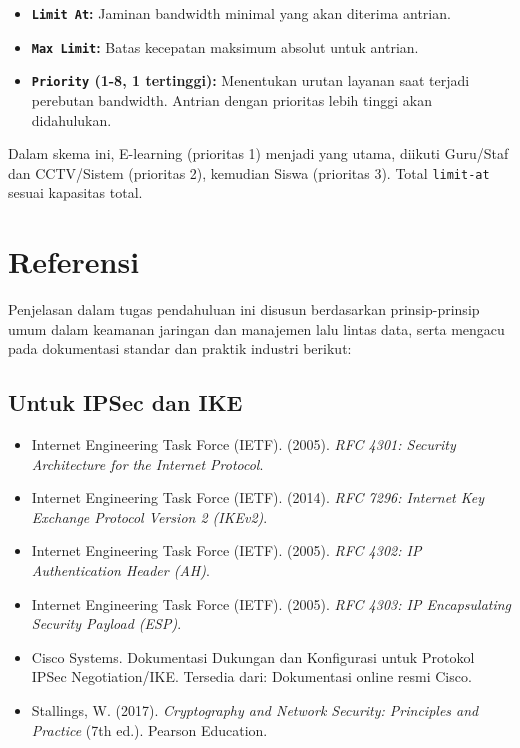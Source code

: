 \begin{enumerate}
\begin{itemize}
        \begin{itemize}
            \item \textbf{\texttt{Limit At}:} Jaminan bandwidth minimal yang akan diterima antrian.
            \item \textbf{\texttt{Max Limit}:} Batas kecepatan maksimum absolut untuk antrian.
            \item \textbf{\texttt{Priority} (1-8, 1 tertinggi):} Menentukan urutan layanan saat terjadi perebutan bandwidth. Antrian dengan prioritas lebih tinggi akan didahulukan.
        \end{itemize}
        Dalam skema ini, E-learning (prioritas 1) menjadi yang utama, diikuti Guru/Staf dan CCTV/Sistem (prioritas 2), kemudian Siswa (prioritas 3). Total \texttt{limit-at} sesuai kapasitas total.
    \end{itemize}
\end{enumerate}

\section*{Referensi}

Penjelasan dalam tugas pendahuluan ini disusun berdasarkan prinsip-prinsip umum dalam keamanan jaringan dan manajemen lalu lintas data, serta mengacu pada dokumentasi standar dan praktik industri berikut:

\subsection*{Untuk IPSec dan IKE}
\begin{itemize}
    \item Internet Engineering Task Force (IETF). (2005). \textit{RFC 4301: Security Architecture for the Internet Protocol}.
    \item Internet Engineering Task Force (IETF). (2014). \textit{RFC 7296: Internet Key Exchange Protocol Version 2 (IKEv2)}.
    \item Internet Engineering Task Force (IETF). (2005). \textit{RFC 4302: IP Authentication Header (AH)}.
    \item Internet Engineering Task Force (IETF). (2005). \textit{RFC 4303: IP Encapsulating Security Payload (ESP)}.
    \item Cisco Systems. Dokumentasi Dukungan dan Konfigurasi untuk Protokol IPSec Negotiation/IKE. Tersedia dari: Dokumentasi online resmi Cisco.
    \item Stallings, W. (2017). \textit{Cryptography and Network Security: Principles and Practice} (7th ed.). Pearson Education.
\end{itemize}

